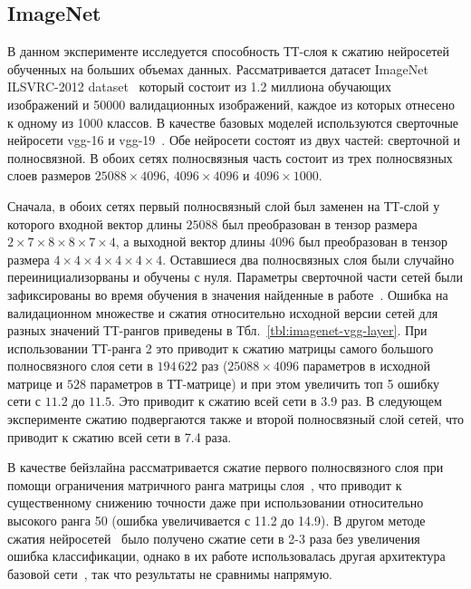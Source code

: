 \subsection{ImageNet}
В данном эксперименте исследуется способность ТТ-слоя к сжатию нейросетей обученных на больших объемах данных. Рассматривается датасет ImageNet ILSVRC-2012 dataset~\cite{Russakovsky2015ImageNet} который состоит из 1.2 миллиона обучающих изображений и 50000 валидационных изображений, каждое из которых отнесено к одному из 1000 классов. В качестве базовых моделей используются сверточные нейросети vgg-16 и vgg-19~\cite{simonyan15}. Обе нейросети состоят из двух частей: сверточной и полносвязной. В обоих сетях полносвязныя часть состоит из трех полносвязных слоев размеров $25088 \times 4096$, $4096 \times 4096$ и $4096 \times 1000$.

Сначала, в обоих сетях первый полносвязный слой был заменен на ТТ-слой у которого входной вектор длины $25088$ был преобразован в тензор размера $2 \times 7 \times 8 \times 8 \times 7 \times 4$, а выходной вектор длины $4096$ был преобразован в тензор размера $4 \times 4 \times 4 \times 4 \times 4 \times 4$. Оставшиеся два полносвязных слоя были случайно переинициализорваны и обучены с нуля. Параметры сверточной части сетей были зафиксированы во время обучения в значения найденные в работе~\cite{Russakovsky2015ImageNet}. Ошибка на валидационном множестве и сжатия относительно исходной версии сетей для разных значений ТТ-рангов приведены в Тбл.~\ref{tbl:imagenet-vgg-layer}. При использовании ТТ-ранга 2 это приводит к сжатию матрицы самого большого полносвязного слоя сети в $194\,622$ раз ($25088 \times 4096$ параметров в исходной матрице и $528$ параметров в ТТ-матрице) и при этом увеличить топ 5 ошибку сети с $11.2$ до $11.5$. Это приводит к сжатию всей сети в 3.9 раз. В следующем эксперименте сжатию подвергаются также и второй полносвязный слой сетей, что приводит к сжатию всей сети в 7.4 раза.

В качестве бейзлайна рассматривается сжатие первого полносвязного слоя при помощи ограничения матричного ранга матрицы слоя~\cite{Jimmy2014lowRankSNN}, что приводит к существенному снижению точности даже при использовании относительно высокого ранга 50 (ошибка увеличивается с 11.2 до 14.9). В другом методе сжатия нейросетей~\cite{yang2014deep} было получено сжатие сети в 2-3 раза без увеличения ошибка классификации, однако в их работе использовалась другая архитектура базовой сети~\cite{Krizhevsky2012AlexNet}, так что результаты не сравнимы напрямую.




